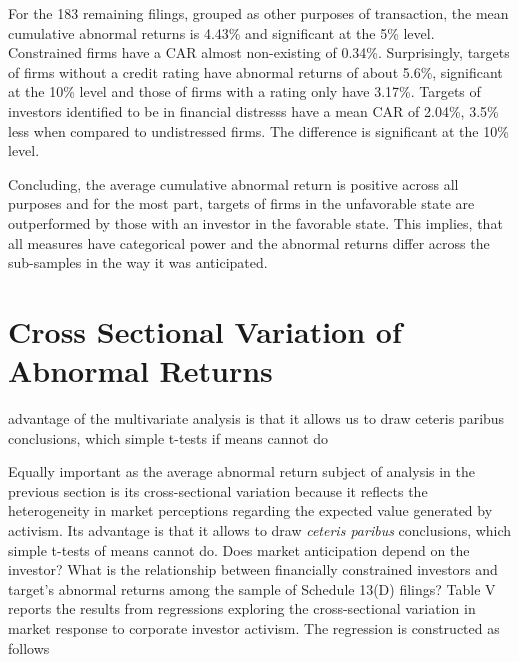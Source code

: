 \documentclass[12pt]{article}
\begin{document}
For the 183 remaining filings, grouped as other purposes of transaction, the mean cumulative abnormal returns is 4.43\% and significant at the 5\% level. Constrained firms have a CAR almost non-existing of 0.34\%. Surprisingly, targets of firms without a credit rating have abnormal returns of about 5.6\%, significant at the 10\% level and those of firms with a rating only have 3.17\%. 
Targets of investors identified to be in financial distresss have a mean CAR of 2.04\%, 3.5\% less when compared to undistressed firms. The difference is significant at the 10\% level. 

Concluding, the average cumulative abnormal return is positive across all purposes and for the most part, targets of firms in the unfavorable state are outperformed by those with an investor in the favorable state. This implies, that all measures have categorical power and the abnormal returns differ across the sub-samples in the way it was anticipated.

\section{Cross Sectional Variation of Abnormal Returns}

\begin{center}
	advantage of the multivariate analysis is that it allows us to draw ceteris paribus conclusions, which simple t-tests if means cannot do \citep[p.111]{Khatami2014}
\end{center}

Equally important as the average abnormal return subject of analysis in the previous section is its cross-sectional variation because it reflects the heterogeneity in market perceptions regarding the expected value generated by activism.  Its advantage is that it allows to draw \emph{ceteris paribus} conclusions, which simple t-tests of means cannot do. Does market anticipation depend on the investor? What is the relationship between financially constrained investors and target's abnormal returns among the sample of Schedule 13(D) filings? Table V reports the results from regressions exploring the cross-sectional variation in market response to corporate investor activism. The regression is constructed as follows 
\end{document}
